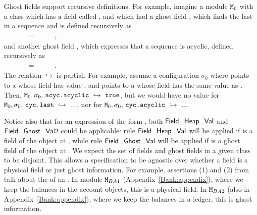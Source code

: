 Ghost fields support recursive definitions. For example, imagine a module ${\mbox{\tt{\ensuremath{{\mbox{\tt{M}}}}}}}_0$ with
a class  which has a field called , and which 
had a ghost field , which finds  the last  in a sequence
and is defined recursively as \\
$~ \strut \hspace{.1cm}$ \ \ \ \ \ =\   \  \  \ ,\\
and another ghost field , which expresses that a sequence is acyclic,
defined recursively as \\
$~ \strut \hspace{.1cm}$ \ \ \ \ \ =\   \  \  \ .\\



The relation $ \hookrightarrow$ is partial. 
For example, assume   a configuration
$\sigma_0$ where
 points to a  whose field  has value , and   
 points to a  whose field  has the same value as . Then,   
$\M_0,\sigma_0,\,\prg{acyc.acyclic}  \ \hookrightarrow\  \prg{true}$, but we would have no value for 
$\M_0,\sigma_0,\, \prg{cyc.last}  \ \hookrightarrow\  ...$, nor for
$\M_0,\sigma_0,\, \prg{cyc.acyclic}  \ \hookrightarrow\  ...$.

Notice also that for an expression of the form  
, both ${\sf {Field\_Heap\_Val}}$ and ${\sf {Field\_Ghost\_Val2}}$ could be applicable: rule ${\sf {Field\_Heap\_Val}}$
will be applied if  is a field of the object at , while rule ${\sf {Field\_Ghost\_Val}}$
will be applied if  is a ghost field of the object at . We expect the set of fields and ghost fields in a 
given class to be disjoint.
This allows a specification to be agnostic over whether a field is a physical field or just ghost information.
For example, assertions (1) and (2) from  %
 talk about the  of an . 
In module ${\mbox{\tt{\ensuremath{{\mbox{\tt{M}}}}}}}_{BA1}$ (Appendix~\ref{Bank:appendix}), where we keep the balances in the account objects, this is a physical field. 
In ${\mbox{\tt{\ensuremath{{\mbox{\tt{M}}}}}}}_{BA2}$ (also in Appendix~\ref{Bank:appendix}), where we keep the
balances in a ledger, this is ghost information.  
 



